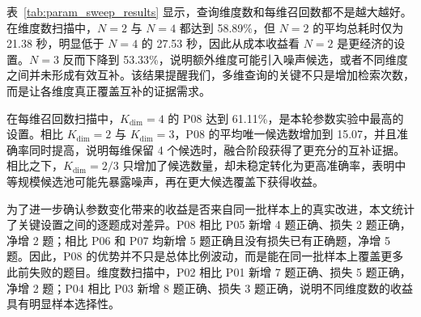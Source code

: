 \begin{table}[!htbp]
\centering
\fontsize{7.8pt}{8.6pt}\selectfont
\setlength{\tabcolsep}{4pt}
\renewcommand{\arraystretch}{0.86}
\caption{多维查询参数扫描结果。}
\label{tab:param_sweep_results}
\end{table}

表~\ref{tab:param_sweep_results} 显示，查询维度数和每维召回数都不是越大越好。在维度数扫描中，$N=2$ 与 $N=4$ 都达到 58.89\%，但 $N=2$ 的平均总耗时仅为 21.38 秒，明显低于 $N=4$ 的 27.53 秒，因此从成本收益看 $N=2$ 是更经济的设置。$N=3$ 反而下降到 53.33\%，说明额外维度可能引入噪声候选，或者不同维度之间并未形成有效互补。该结果提醒我们，多维查询的关键不只是增加检索次数，而是让各维度真正覆盖互补的证据需求。

在每维召回数扫描中，$K_{\mathrm{dim}}=4$ 的 P08 达到 61.11\%，是本轮参数实验中最高的设置。相比 $K_{\mathrm{dim}}=2$ 与 $K_{\mathrm{dim}}=3$，P08 的平均唯一候选数增加到 15.07，并且准确率同时提高，说明每维保留 4 个候选时，融合阶段获得了更充分的互补证据。相比之下，$K_{\mathrm{dim}}=2/3$ 只增加了候选数量，却未稳定转化为更高准确率，表明中等规模候选池可能先暴露噪声，再在更大候选覆盖下获得收益。

为了进一步确认参数变化带来的收益是否来自同一批样本上的真实改进，本文统计了关键设置之间的逐题成对差异。P08 相比 P05 新增 4 题正确、损失 2 题正确，净增 2 题；相比 P06 和 P07 均新增 5 题正确且没有损失已有正确题，净增 5 题。因此，P08 的优势并不只是总体比例波动，而是能在同一批样本上覆盖更多此前失败的题目。维度数扫描中，P02 相比 P01 新增 7 题正确、损失 5 题正确，净增 2 题；P04 相比 P03 新增 8 题正确、损失 3 题正确，说明不同维度数的收益具有明显样本选择性。

